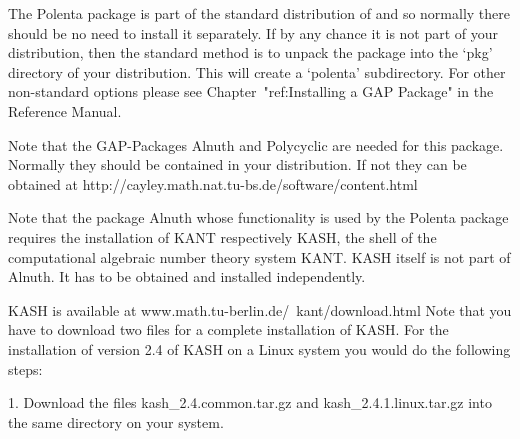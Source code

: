 
\null

The Polenta package is part of the standard distribution of {\GAP} and
so normally there should be no need to install it separately.
If by any chance it is not part of your {\GAP} distribution, then 
the standard method is to unpack	 the package into the `pkg'
directory  of your {\GAP} distribution.  This will create a `polenta'
subdirectory. 
For other non-standard options please see  Chapter~"ref:Installing a
GAP Package" in the {\GAP} Reference Manual.

Note that the GAP-Packages Alnuth and Polycyclic are needed for this package.
Normally they should be contained in your distribution. If not 
they can be obtained at
\begintt
             http://cayley.math.nat.tu-bs.de/software/content.html
\endtt



                    
Note that the {\GAP} package Alnuth whose functionality is used by the Polenta
package requires the installation of KANT respectively
KASH, the shell
of the computational algebraic number theory system KANT.  KASH itself
is not part of Alnuth.  It has to be obtained and installed
independently.
                                                            
KASH is available at
\begintt
               www.math.tu-berlin.de/~kant/download.html
\endtt
Note that you have to download two files for a complete installation
of KASH.  For the installation of version 2.4 of KASH on a Linux
system you would do the following steps:
\beginlist
\item{1.} Download the files
    kash_2.4.common.tar.gz and kash_2.4.1.linux.tar.gz
    into the same directory on your system.
                                                                               

